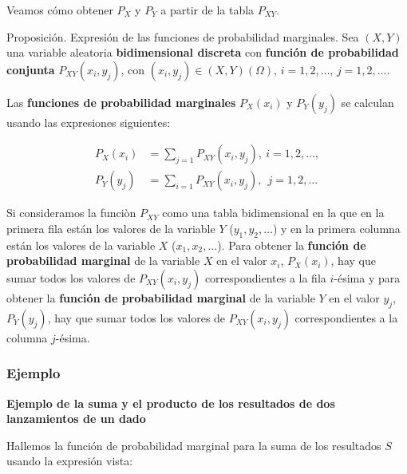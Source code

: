 \documentclass[]{book}
\begin{document}
Veamos cómo obtener \(P_X\) y \(P_Y\) a partir de la tabla \(P_{XY}\).

Proposición. Expresión de las funciones de probabilidad marginales.
Sea \((X,Y)\) una variable aleatoria \textbf{bidimensional discreta} con \textbf{función de probabilidad conjunta} \(P_{XY}(x_i,y_j)\), con \((x_i,y_j)\in (X,Y)(\Omega)\), \(i=1,2,\ldots\), \(j=1,2,\ldots\).

Las \textbf{funciones de probabilidad marginales} \(P_X(x_i)\) y \(P_Y(y_j)\) se calculan usando las expresiones siguientes:

\[
\begin{array}{rl}
P_X(x_i)  & = \sum_{j=1} P_{XY}(x_i,y_j),\  i=1,2,\ldots,\\ P_Y(y_j) &  = \sum_{i=1} P_{XY}(x_i,y_j),\ \ j=1,2,\ldots
\end{array}
\]

Si consideramos la funciòn \(P_{XY}\) como una tabla bidimensional en la que en la primera fila están los valores de la variable \(Y\) (\(y_1,y_2,\ldots\)) y en la primera columna están los valores de la variable \(X\) (\(x_1,x_2,\ldots\)). Para obtener la \textbf{función de probabilidad marginal} de la variable \(X\) en el valor \(x_i\), \(P_X(x_i)\), hay que sumar todos los valores de \(P_{XY}(x_i,y_j)\) correspondientes a la fila \(i\)-ésima y para obtener la \textbf{función de probabilidad marginal} de la variable \(Y\) en el valor \(y_j\), \(P_Y(y_j)\), hay que sumar todos los valores de \(P_{XY}(x_i,y_j)\) correspondientes a la columna \(j\)-ésima.

\hypertarget{ejemplo}{%
\subsubsection{Ejemplo}\label{ejemplo}}

\textbf{Ejemplo de la suma y el producto de los resultados de dos lanzamientos de un dado}

Hallemos la función de probabilidad marginal para la suma de los resultados \(S\) usando la expresión vista:
\end{document}
